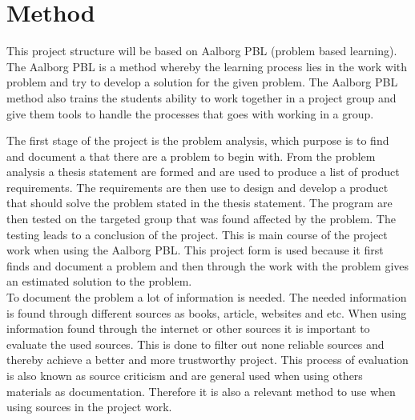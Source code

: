 \section{Method}
This project structure will be based on Aalborg PBL (problem based learning). The Aalborg PBL is a method whereby the learning process lies in the work with problem and try to develop a solution for the given problem.
The Aalborg PBL method also trains the students ability to work together in a project group and give them tools to handle the processes that goes with working in a group.

The first stage of the project is the problem analysis, which purpose is to find and document a that there are a problem to begin with. From the problem analysis a thesis statement are formed and are used to produce a list of product requirements.
The requirements are then use to design and develop a product that should solve the problem stated in the thesis statement.
The program are then tested on the targeted group that was found affected by the problem. The testing leads to a conclusion of the project. This is main course of the project work when using the Aalborg PBL. %
This project form is used because it first finds and document a problem and then through the work with the problem gives an estimated solution to the problem.\\

To document the problem a lot of information is needed. The needed information is found through different sources as books, article, websites and etc. When using information found through the internet or other sources it is important to evaluate the used sources.
This is done to filter out none reliable sources and thereby achieve a better and more trustworthy project.
This process of evaluation is also known as source criticism and are general used when using others materials as documentation. Therefore it is also a relevant method to use when using sources in the project work.\\
